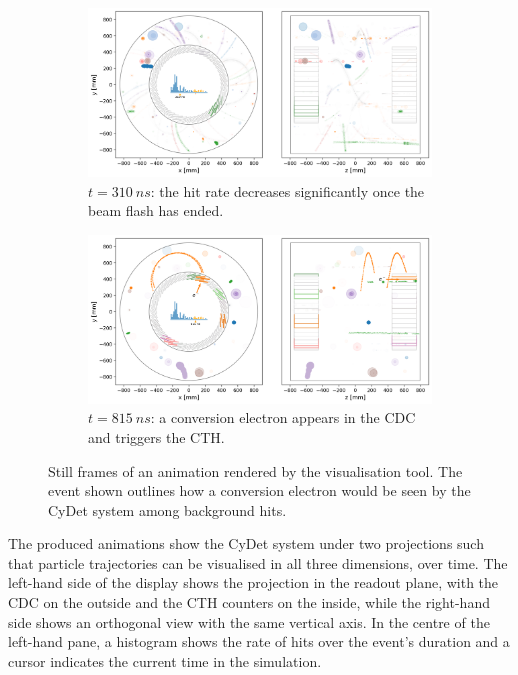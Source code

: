 \begin{figure}
    \begin{subfigure}[t]{0.49\textwidth}
    \centering
    \includegraphics[width=\textwidth]{chapter3/frame_067.png}
    \caption{$t=\SI{310}{ns}$: the hit rate decreases significantly once the beam flash has ended.}
    \end{subfigure}
    \hfill
    \begin{subfigure}[t]{0.49\textwidth}
    \centering
    \includegraphics[width=\textwidth]{chapter3/frame_192.png}
    \caption{$t=\SI{815}{ns}$: a conversion electron appears in the CDC and triggers the CTH.}
    \label{fig:animation:conv}
    \end{subfigure}
    
    \caption{Still frames of an animation rendered by the visualisation tool. The event shown outlines how a conversion electron would be seen by the CyDet system among background hits.}
    \label{fig:animation}
\end{figure}


The produced animations show the CyDet system under two projections such that
particle trajectories can be visualised in all three dimensions, over time. The
left-hand side of the display shows the projection in the readout plane, with
the CDC on the outside and the CTH counters on the inside, while the right-hand
side shows an orthogonal view with the same vertical axis. In the centre of the
left-hand pane, a histogram shows the rate of hits over the event's duration and
a cursor indicates the current time in the simulation.

